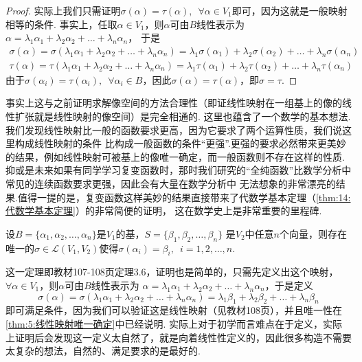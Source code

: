 \begin{proof}
    实际上我们只需证明$\sigma(\alpha)=\tau(\alpha),\enspace\forall \alpha \in V_1$即可，因为这就是一般映射相等的条件.
    事实上，任取$\alpha \in V_1$，则$\alpha$可由$B$线性表示为$\alpha=\lambda_1\alpha_1+\lambda_2\alpha_2+\ldots+\lambda_n\alpha_n$，
    于是
    \begin{gather*}
        \sigma(\alpha)=\sigma(\lambda_1\alpha_1+\lambda_2\alpha_2+\ldots+\lambda_n\alpha_n)=\lambda_1\sigma(\alpha_1)+\lambda_2\sigma(\alpha_2)+\ldots+\lambda_n\sigma(\alpha_n) \\
        \tau(\alpha)=\tau(\lambda_1\alpha_1+\lambda_2\alpha_2+\ldots+\lambda_n\alpha_n)=\lambda_1\tau(\alpha_1)+\lambda_2\tau(\alpha_2)+\ldots+\lambda_n\tau(\alpha_n)
    \end{gather*}
    由于$\sigma(\alpha_i)=\tau(\alpha_i),\enspace\forall \alpha_i \in B$，因此$\sigma(\alpha)=\tau(\alpha)$，即$\sigma=\tau$.
\end{proof}

事实上这与之前证明求解像空间的方法合理性（即证线性映射在一组基上的像的线性扩张就是线性映射的像空间）是完全相通的.
这里也蕴含了一个数学的基本想法.我们发现线性映射比一般的函数要求更高，因为它要求了两个运算性质，我们说这里构成线性映射的条件
比构成一般函数的条件``更强''.更强的要求必然带来更美妙的结果，例如线性映射可被基上的像唯一确定，而一般函数则不存在这样的性质.
抑或是未来如果有同学学习复变函数时，那时我们研究的``全纯函数''比数学分析中常见的连续函数要求更强，因此会有大量在数学分析中
无法想象的非常漂亮的结果.值得一提的是，复变函数这样美妙的结果直接带来了代数学基本定理（\autoref{thm:14:代数学基本定理}）的非常简便的证明，
这在数学史上是非常重要的里程碑.

\begin{theorem}\label{thm:5:线性映射构造}
    设$B=\{\alpha_1,\alpha_2,\ldots,\alpha_n\}$是$V_1$的基，$S=\{\beta_1,\beta_2,\ldots,\beta_n\}$
    是$V_2$中任意$n$个向量，则存在唯一的$\sigma\in \mathcal{L}(V_1,V_2)$使得$\sigma(\alpha_i)=\beta_i,\enspace i=1,2,\ldots,n$.
\end{theorem}
这一定理即教材107-108页定理3.6，证明也是简单的，只需先定义出这个映射，$\forall \alpha \in V_1$，则$\alpha$可由$B$线性表示为
$\alpha=\lambda_1\alpha_1+\lambda_2\alpha_2+\ldots+\lambda_n\alpha_n$，于是定义
\[\sigma(\alpha)=\sigma(\lambda_1\alpha_1+\lambda_2\alpha_2+\ldots+\lambda_n\alpha_n)=\lambda_1\beta_1+\lambda_2\beta_2+\ldots+\lambda_n\beta_n\]
即可满足条件，因为我们可以验证这是线性映射（见教材108页），并且唯一性在\autoref{thm:5:线性映射唯一确定}中已经说明.
实际上对于初学而言难点在于定义，实际上证明后会发现这一定义太自然了，就是向着线性性定义的，因此很多构造不需要太复杂的想法，自然的、满足要求的是最好的.

